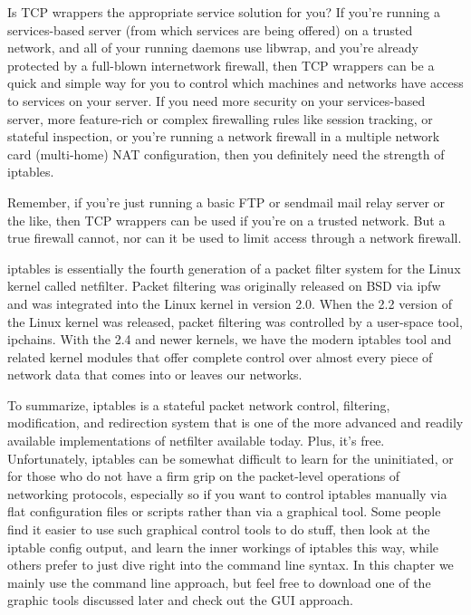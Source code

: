 \documentclass{article}
\begin{document}
\begin{itemize}
Is TCP wrappers the appropriate service solution for you? If you're running a services-based server (from which services are being offered) on a trusted network, and all of your running daemons use libwrap, and you're already protected by a full-blown internetwork firewall, then TCP wrappers can be a quick and simple way for you to control which machines and networks have access to services on your server. If you need more security on your services-based server, more feature-rich or complex firewalling rules like session tracking, or stateful inspection, or you're running a network firewall in a multiple network card (multi-home) NAT configuration, then you definitely need the strength of iptables.

Remember, if you're just running a basic FTP or sendmail mail relay server or the like, then TCP wrappers can be used if you're on a trusted network. But a true firewall cannot, nor can it be used to limit access through a network firewall.

iptables is essentially the fourth generation of a packet filter system for the Linux kernel called netfilter. Packet filtering was originally released on BSD via ipfw and was integrated into the Linux kernel in version 2.0. When the 2.2 version of the Linux kernel was released, packet filtering was controlled by a user-space tool, ipchains. With the 2.4 and newer kernels, we have the modern iptables tool and related kernel modules that offer complete control over almost every piece of network data that comes into or leaves our networks.

To summarize, iptables is a stateful packet network control, filtering, modification, and redirection system that is one of the more advanced and readily available implementations of netfilter available today. Plus, it's free. Unfortunately, iptables can be somewhat difficult to learn for the uninitiated, or for those who do not have a firm grip on the packet-level operations of networking protocols, especially so if you want to control iptables manually via flat configuration files or scripts rather than via a graphical tool. Some people find it easier to use such graphical control tools to do stuff, then look at the iptable config output, and learn the inner workings of iptables this way, while others prefer to just dive right into the command line syntax. In this chapter we mainly use the command line approach, but feel free to download one of the graphic tools discussed later and check out the GUI approach.


\end{itemize}
\end{document}
